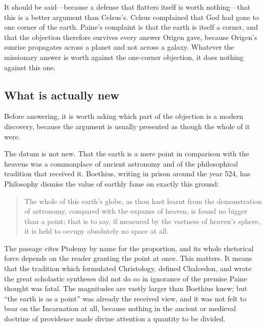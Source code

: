 It should be said---because a defense that flatters itself is worth nothing---that this is a better argument than Celsus's. Celsus complained that God had gone to one corner of the earth. Paine's complaint is that the earth is itself a corner, and that the objection therefore survives every answer Origen gave, because Origen's sunrise propagates across a planet and not across a galaxy. Whatever the missionary answer is worth against the one-corner objection, it does nothing against this one.

\subsection{What is actually new}

Before answering, it is worth asking which part of the objection is a modern discovery, because the argument is usually presented as though the whole of it were.

The datum is not new. That the earth is a mere point in comparison with the heavens was a commonplace of ancient astronomy and of the philosophical tradition that received it. Boethius, writing in prison around the year 524, has Philosophy dismiss the value of earthly fame on exactly this ground:

\begin{quote}\small
The whole of this earth's globe, as thou hast learnt from the demonstration of astronomy, compared with the expanse of heaven, is found no bigger than a point; that is to say, if measured by the vastness of heaven's sphere, it is held to occupy absolutely no space at all.
\end{quote}

The passage cites Ptolemy by name for the proportion, and its whole rhetorical force depends on the reader granting the point at once. This matters. It means that the tradition which formulated Christology, defined Chalcedon, and wrote the great scholastic syntheses did not do so in ignorance of the premise Paine thought was fatal. The magnitudes are vastly larger than Boethius knew; but ``the earth is as a point'' was already the received view, and it was not felt to bear on the Incarnation at all, because nothing in the ancient or medieval doctrine of providence made divine attention a quantity to be divided.

